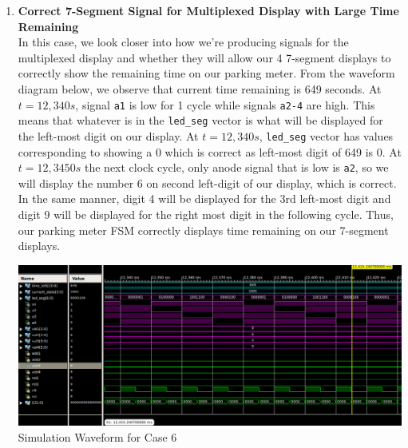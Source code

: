 \documentclass{article}
\begin{document}
\begin{enumerate}
    \item \textbf{Correct 7-Segment Signal for Multiplexed Display with Large Time Remaining}   \\
    In this case, we look closer into how we're producing signals for the multiplexed display and whether they will allow our 4 7-segment displays to correctly show the remaining time on our parking meter. From the waveform diagram below, we observe that current time remaining is 649 seconds. At $t=12,340s$, signal \texttt{a1} is low for 1 cycle while signals \texttt{a2-4} are high. This means that whatever is in the \texttt{led\_seg} vector is what will be displayed for the left-most digit on our display. At $t=12,340s$, \texttt{led\_seg} vector has values corresponding to showing a 0 which is correct as left-most digit of 649 is 0. At $t=12,3450s$ the next clock cycle, only anode signal that is low is \texttt{a2}, so we will display the number 6 on second left-digit of our display, which is correct. In the same manner, digit 4 will be displayed for the 3rd left-most digit and digit 9 will be displayed for the right most digit in the following cycle. Thus, our parking meter FSM correctly displays time remaining on our 7-segment displays. 
    \begin{center}
        \includegraphics[scale=0.35]{waveform-6.png} \\
        \caption{Simulation Waveform for Case 6}
    \end{center}
    

\end{enumerate}
\end{document}
